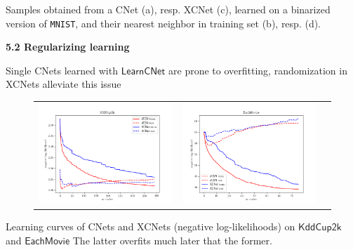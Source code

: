 \documentclass[final]{beamer}
\begin{document}
\begin{frame}{}
\begin{textblock}{17.5}
\begin{figure}[t]
\begin{tabular}{SSSSSXSSSSSXSSSSSXSSSSS}
\end{tabular}

\label{fig:vis}
\end{figure}
\hspace{50pt}
\begin{minipage}{0.8\linewidth}
  \vspace{-20pt}
\scriptsize  Samples obtained from a CNet (a), resp. XCNet (c), learned on 
   a binarized version of \texttt{MNIST}, and their nearest neighbor in training set (b), resp. (d).
 \end{minipage}


 \vspace{20pt}
 {\bf 5.2 Regularizing learning}\par
Single CNets learned with $\mathsf{LearnCNet}$ are prone to overfitting, randomization in
 \textsf{XCNets} alleviate this issue
    
\begin{figure}[t]
  \label{fig:ll}
  \centering
  \begin{tabular}{ccc}
    \includegraphics[width=0.48\linewidth]{figures/kdd} &
    \includegraphics[width=0.48\linewidth]{figures/tmovie}
  \end{tabular}
\end{figure}
\hspace{50pt}
\begin{minipage}{0.8\linewidth}
  \vspace{-10pt}
\scriptsize  Learning curves of CNets and XCNets (negative
log-likelihoods) on $\mathsf{KddCup2k}$ and $\mathsf{EachMovie}$
The latter overfits much later that the former.
\end{minipage}




\end{textblock}
\end{frame}
\end{document}
